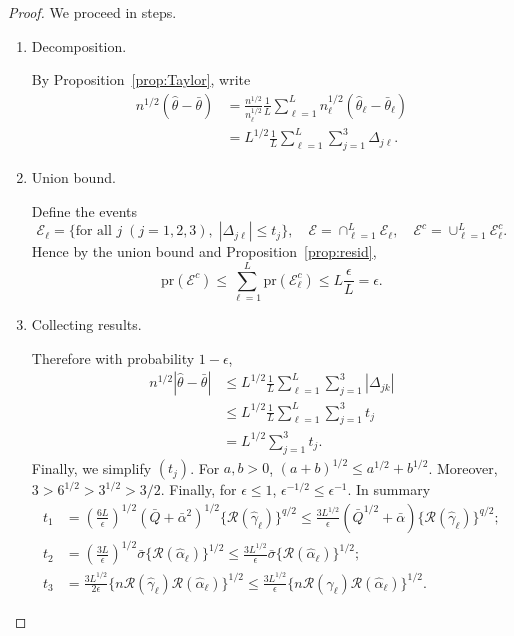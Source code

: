 \begin{proof}
We proceed in steps.
\begin{enumerate}
    \item Decomposition.
    
    By Proposition~\ref{prop:Taylor}, write
    \begin{align*}
    n^{1/2}(\hat{\theta}-\bar{\theta})
    &=\frac{n^{1/2}}{n_{\ell}^{1/2}}\frac{1}{L} \sum_{\ell=1}^L n_{\ell}^{1/2} (\hat{\theta}_{\ell}-\bar{\theta}_{\ell}) \\
    &= L^{1/2}\frac{1}{L} \sum_{\ell=1}^L \sum_{j=1}^3 \Delta_{j\ell}.
\end{align*} 

    \item Union bound.
    
    Define the events
$$
\mathcal{E}_{\ell}=\{\text{for all } j \; (j=1,2,3),\; |\Delta_{j\ell}|\leq t_j\},\quad \mathcal{E}=\cap_{\ell=1}^L \mathcal{E}_{\ell},\quad \mathcal{E}^c=\cup_{\ell=1}^L \mathcal{E}^c_{\ell}.
$$
Hence by the union bound and Proposition~\ref{prop:resid},
$$
\text{pr}(\mathcal{E}^c)\leq \sum_{\ell=1}^L \text{pr}(\mathcal{E}^c_{\ell}) \leq L\frac{\epsilon}{L}=\epsilon.
$$
    \item Collecting results.

    Therefore with probability $1-\epsilon$,
\begin{align*}
 n^{1/2}|\hat{\theta}-\bar{\theta}|&\leq L^{1/2}\frac{1}{L} \sum_{\ell=1}^L \sum_{j=1}^3 |\Delta_{jk}| \\
 &\leq L^{1/2}\frac{1}{L} \sum_{\ell=1}^L \sum_{j=1}^3 t_j \\
 &=L^{1/2}\sum_{j=1}^3 t_j.
\end{align*}
Finally, we simplify $(t_j)$. For $a,b>0$, $(a+b)^{1/2}\leq a^{1/2}+b^{1/2}$. Moreover, $3>6^{1/2}>3^{1/2}>3/2$. Finally, for $\epsilon\leq 1$, $\epsilon^{-1/2}\leq \epsilon^{-1}$. In summary
\begin{align*}
    t_1&=\left(\frac{6L}{\epsilon}\right)^{1/2}(\bar{Q}+\bar{\alpha}^2)^{1/2}\{\mathcal{R}(\hat{\gamma}_{\ell})\}^{q/2}
   \leq \frac{3L^{1/2}}{\epsilon}(\bar{Q}^{1/2}+\bar{\alpha})\{\mathcal{R}(\hat{\gamma}_{\ell})\}^{q/2}; \\
    t_2&=\left(\frac{3L}{\epsilon}\right)^{1/2}\bar{\sigma}\{\mathcal{R}(\hat{\alpha}_{\ell})\}^{1/2} 
   \leq \frac{3L^{1/2}}{\epsilon}\bar{\sigma}\{\mathcal{R}(\hat{\alpha}_{\ell})\}^{1/2}; \\
    t_3&=\frac{3L^{1/2}}{2\epsilon}\{n\mathcal{R}(\hat{\gamma}_{\ell})\mathcal{R}(\hat{\alpha}_{\ell})\}^{1/2}
    \leq \frac{3L^{1/2}}{\epsilon}\{n\mathcal{R}(\hat{\gamma}_{\ell})\mathcal{R}(\hat{\alpha}_{\ell})\}^{1/2}.
\end{align*}
\end{enumerate}
\end{proof}

